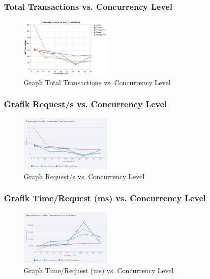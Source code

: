 \documentclass[12pt]{article}
\begin{document}
\subsubsection{Total Transactions vs. Concurrency Level}
\begin{figure}[h!]
\centering
\includegraphics[width=0.4\textwidth]{res/transaction.png}
\caption{Graph Total Transactions vs. Concurrency Level}
\label{fig:arch}
\end{figure}

\subsubsection{Grafik Request/s vs. Concurrency Level}
\begin{figure}[h!]
    \centering
    \includegraphics[width=0.4\textwidth]{res/requestpersecond.png}
    \caption{Graph Request/s vs. Concurrency Level}
    \label{fig:arch}
    \end{figure}


    \subsubsection{Grafik Time/Request (ms) vs. Concurrency Level}
\begin{figure}[h!]
    \centering
    \includegraphics[width=0.4\textwidth]{res/timeperrequest.png}
    \caption{Graph Time/Request (ms) vs. Concurrency Level}
    \label{fig:arch}
    \end{figure}
\end{document}
